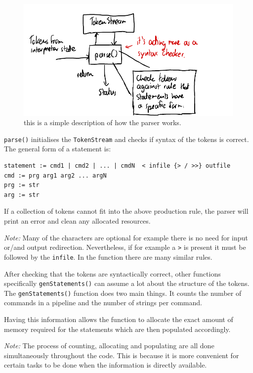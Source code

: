 \documentclass[12pt]{article}
\begin{document}
\begin{figure}[H]
\centering
\includegraphics{parser}
\caption{this is a simple description of how the
parser works.}
\end{figure}

\texttt{parse()} initialises the \texttt{TokenStream} and checks
if syntax of the tokens is correct. The general form of a
statement is:

\begin{verbatim}
statement := cmd1 | cmd2 | ... | cmdN  < infile {> / >>} outfile
cmd := prg arg1 arg2 ... argN
prg := str
arg := str
\end{verbatim}

If a collection of tokens cannot fit into the above
production rule, the parser will print an error and clean any
allocated resources.

\textit{Note:} Many of the characters are optional for example
there is no need for input or/and output redirection.
Nevertheless, if for example a \texttt{>} is present it must be
followed by the \texttt{infile}. In the function there are many
similar rules.

After checking that the tokens are syntactically correct, other
functions specifically \texttt{genStatements()} can assume a lot
about the structure of the tokens. The \texttt{genStatements()}
function does two main things. It counts the number of commands
in a pipeline and the number of strings per command.

Having this information allows the function to allocate the
exact amount of memory required for the statements which are
then populated accordingly.

\textit{Note:} The process of counting, allocating and
populating are all done simultaneously throughout the code. This
is because it is more convenient for certain tasks to be done
when the information is directly available.
\end{document}
